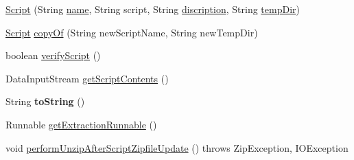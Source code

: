 \begin{DoxyCompactItemize}
\item 
\hyperlink{class_c_a_s_u_a_l_1_1caspac_1_1_script_a6c9c44092063b31f1b5fa30b323e2c21}{Script} (String \hyperlink{class_c_a_s_u_a_l_1_1caspac_1_1_script_a3efcef19df03c62a6c70b08dc56630a7}{name}, String script, String \hyperlink{class_c_a_s_u_a_l_1_1caspac_1_1_script_af7d466f393929435e6a6ccecacc324de}{discription}, String \hyperlink{class_c_a_s_u_a_l_1_1caspac_1_1_script_add96e553bd0b9511f74ac7e41cba4536}{temp\-Dir})
\item 
\hyperlink{class_c_a_s_u_a_l_1_1caspac_1_1_script}{Script} \hyperlink{class_c_a_s_u_a_l_1_1caspac_1_1_script_ae19c81a3460603a10818522d801e43ca}{copy\-Of} (String new\-Script\-Name, String new\-Temp\-Dir)
\item 
boolean \hyperlink{class_c_a_s_u_a_l_1_1caspac_1_1_script_a650e8a68460d2e087028c6b7222ff61d}{verify\-Script} ()
\item 
Data\-Input\-Stream \hyperlink{class_c_a_s_u_a_l_1_1caspac_1_1_script_a17a45608b9e9de9ab8f083781e0ef9b4}{get\-Script\-Contents} ()
\item 
\hypertarget{class_c_a_s_u_a_l_1_1caspac_1_1_script_aa4417a95f79b967e72da3e7e9bd6458e}{String {\bfseries to\-String} ()}\label{class_c_a_s_u_a_l_1_1caspac_1_1_script_aa4417a95f79b967e72da3e7e9bd6458e}

\item 
Runnable \hyperlink{class_c_a_s_u_a_l_1_1caspac_1_1_script_a545611076ea6c3b3e8e0b2ab22e66e4f}{get\-Extraction\-Runnable} ()
\item 
void \hyperlink{class_c_a_s_u_a_l_1_1caspac_1_1_script_a335fa094032e79c5be3daa0e7cdf511c}{perform\-Unzip\-After\-Script\-Zipfile\-Update} ()  throws Zip\-Exception, I\-O\-Exception 
\end{DoxyCompactItemize}

